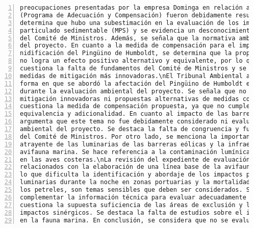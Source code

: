 \begin{Verbatim}[frame=lines, label=Elavoración propia -  Ejemplo de Contexto enviado por el Chatbot a OpenAI
				, fontsize=\scriptsize, numbers=left
				, baselinestretch=0.4
				, formatcom=\color{gray}]
preocupaciones presentadas por la empresa Dominga en relación a las preocupaciones PAC
(Programa de Adecuación y Compensación) fueron debidamente resueltas. Sin embargo, se
determina que hubo una subestimación en la evaluación de los impactos por aporte de material
particulado sedimentable (MPS) y se evidencia un desconocimiento de los antecedentes por parte
del Comité de Ministros. Además, se señala que la normativa ambiental no se adecúa al contexto
del proyecto. En cuanto a la medida de compensación para el impacto en el proceso de
nidificación del Pingüino de Humboldt, se determina que la propuesta presentada por la empresa
no logra un efecto positivo alternativo y equivalente, por lo que se acoge la reclamación. Se
cuestiona la falta de fundamentos del Comité de Ministros y se sugiere la implementación de
medidas de mitigación más innovadoras.\nEl Tribunal Ambiental advierte una debilidad en la
forma en que se abordó la afectación del Pingüino de Humboldt en el islote Totoralillo Norte
durante la evaluación ambiental del proyecto. Se señala que no se consideraron medidas de
mitigación innovadoras ni propuestas alternativas de medidas compensatorias. Además, se
cuestiona la medida de compensación propuesta, ya que no cumple con los requisitos de
equivalencia y adicionalidad. En cuanto al impacto de las barreras eólicas en la avifauna, se
argumenta que este tema no fue debidamente considerado ni evaluado durante la evaluación
ambiental del proyecto. Se destaca la falta de congruencia y fundamentación en la resolución
del Comité de Ministros. Por otro lado, se menciona la importancia de evaluar el efecto
atrayente de las luminarias de las barreras eólicas y la infraestructura portuaria en la
avifauna marina. Se hace referencia a la contaminación lumínica y sus efectos desorientadores
en las aves costeras.\nLa revisión del expediente de evaluación ambiental no muestra estudios
relacionados con la elaboración de una línea base de la avifauna en los sectores mencionados,
lo que dificulta la identificación y abordaje de los impactos potenciales. El uso de
luminarias durante la noche en zonas portuarias y la mortalidad de aves marinas, especialmente
los petreles, son temas sensibles que deben ser considerados. Se advierte la oportunidad de
complementar la información técnica para evaluar adecuadamente estos impactos. Además, se
cuestiona la supuesta suficiencia de las áreas de exclusión y la falta de consideración de los
impactos sinérgicos. Se destaca la falta de estudios sobre el impacto acústico de los buques
en la fauna marina. En conclusión, se considera que no se evaluaron adecuadamente los impactos

\end{Verbatim}
